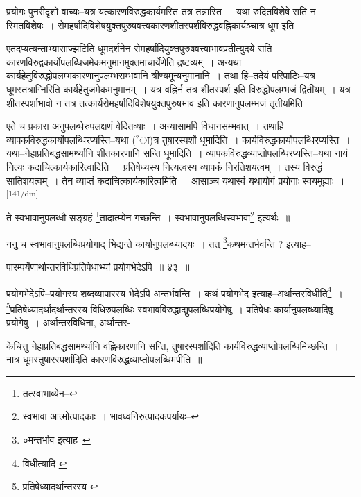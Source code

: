 \documentclass[article,12pt,a4paper]{memoir}
\newcommand{\unclear}[1]{($^{?}$#1)}
\begin{document}
	  \pstart प्रयोगः पुनरीदृशो वाच्यः--यत्र यत्कारणविरुद्धकार्यमस्ति तत्र तन्नास्ति । यथा रुदितविशेषे सति न स्मितविशेषः । रोमहर्षादिविशेषयुक्तपुरुषवत्त्वकारणशीतस्पर्शविरुद्धवह्निकार्यञ्चात्र धूम इति ।
	\pend
      

	  \pstart एतदप्यत्यन्ताभ्यासाज्झटिति धूमदर्शनेन रोमहर्षादियुक्तपुरुषवत्त्वाभावप्रतीत्युदये सति कारणविरुद्वकार्योपलब्धिजमेकमनुमानमुक्तमाचार्येणेति द्रष्टव्यम् । अन्यथा कार्यहेतुविरुद्धोपलम्भकारणानुपलम्भसम्भवानि त्रीण्यमून्यनुमानानि । तथा हि--तदेयं परिपाटिः--यत्र धूमस्तत्राग्निरिति कार्यहेतुजमेकमनुमानम् । यत्र वह्निर्न तत्र शीतस्पर्श इति विरुद्धोपलम्भजं द्वितीयम् । यत्र शीतस्पर्शाभावो न तत्र तत्कार्यरोमहर्षादिविशेषयुक्तपुरुषभाव इति कारणानुपलम्भजं तृतीयमिति ।
	\pend
      

	  \pstart एते च प्रकारा अनुपलब्धेरुपलक्षणं वेदितव्याः । अन्यासामपि विधानसम्भवात् । तथाहि व्यापकविरुद्धकार्योपलब्धिरप्यस्ति--यथा \unclear{ा}त्र तुषारस्पर्शो धूमादिति । कार्यविरुद्धकार्योपलब्धिरप्यस्ति । यथा--नेहाप्रतिबद्धसामर्थ्यानि शीतकारणानि सन्ति धूमादिति । व्यापकविरुद्धव्याप्तोपलब्धिरप्यस्ति--यथा नायं नित्यः कदाचित्कार्यकारित्वादिति । प्रतिषेध्यस्य नित्यत्वस्य व्यापकं निरतिशयत्वम् । तस्य विरुद्धं सातिशयत्वम् । तेन व्याप्तं कदाचित्कार्यकारित्वमिति । आसाञ्च यथास्वं यथायोगं प्रयोगाः स्वयमूह्याः ।
	\pend
      \leavevmode\textsuperscript{\rmlatinfont\tiny [141/dm]}

	  \pstart ते स्वभावानुपलब्धौ सङ्ग्रहं \footnote{तत्स्वाभाव्येन--\cite{dp-msD-n}}तादात्म्येन गच्छन्ति । स्वभावानुपलब्धिस्वभावा\footnote{स्वभावा आत्मोत्पादकाः । भावध्वनिरुत्पादकपर्यायः--\cite{dp-msD-n}} इत्यर्थः ॥
	\pend
       

	  \pstart ननु च स्वभावानुपलब्धिप्रयोगाद् भिद्यन्ते कार्यानुपलब्ध्यादयः । तत् \footnote{०मन्तर्भाव इत्याह--\cite{dp-msC}}कथमन्तर्भवन्ति ? इत्याह--
	\pend
       

	  \pstart पारम्पर्येणार्थान्तरविधिप्रतिपेधाभ्यां प्रयोगभेदेऽपि ॥ ४३ ॥
	\pend
       

	  \pstart प्रयोगभेदेऽपि--प्रयोगस्य शब्दव्यापारस्य भेदेऽपि अन्तर्भवन्ति । कथं प्रयोगभेद इत्याह--अर्थान्तरविधीति\footnote{विधीत्यादि \cite{dp-edP} \cite{dp-edH} \cite{dp-edE} \cite{dp-edN}} । \footnote{प्रतिषेध्यादर्थान्तरस्य \cite{dp-msB}}प्रतिषेध्यादर्थादर्थान्तरस्य विधिरुपलब्धिः स्वभावविरुद्धाद्युपलब्धिप्रयोगेषु । प्रतिषेधः कार्यानुपलब्ध्यादिषु प्रयोगेषु । अर्थान्तरविधिना, अर्थान्तर-
	\pend
      

	  \pstart केचित्तु नेहाप्रतिबद्धसामर्थ्यानि वह्निकारणानि सन्ति, तुषारस्पर्शादिति कार्यविरुद्धव्याप्तोपलब्धिमिच्छन्ति । नात्र धूमस्तुषारस्पर्शादिति कारणविरुद्धव्याप्तोपलब्धिमपीति ॥
	\pend
      
\end{document}
